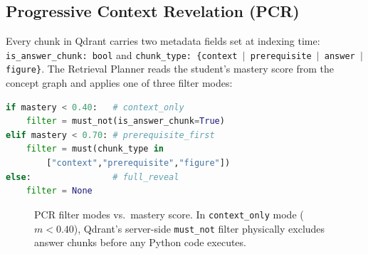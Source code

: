 \documentclass[11pt]{article}
\begin{document}
\subsection{Progressive Context Revelation (PCR)}
\label{sec:pcr}

Every chunk in Qdrant carries two metadata fields set at indexing time:
\texttt{is\_answer\_chunk: bool} and
\texttt{chunk\_type: \{context $|$ prerequisite $|$ answer $|$ figure\}}.
The Retrieval Planner reads the student's mastery score from the concept graph
and applies one of three filter modes:

\begin{lstlisting}[language=Python]
if mastery < 0.40:   # context_only
    filter = must_not(is_answer_chunk=True)
elif mastery < 0.70: # prerequisite_first
    filter = must(chunk_type in
        ["context","prerequisite","figure"])
else:                # full_reveal
    filter = None
\end{lstlisting}

\begin{figure}[h]
\centering
{}
\caption{PCR filter modes vs.\ mastery score. In \texttt{context\_only} mode ($m<0.40$), Qdrant's server-side \texttt{must\_not} filter physically excludes answer chunks before any Python code executes.}
\label{fig:pcr}
\end{figure}
\end{document}
